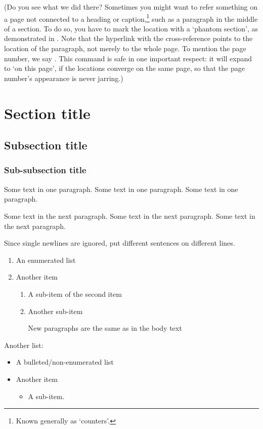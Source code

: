 \documentclass[embargoed]{grattan}
\begin{document}
(Do you see what we did there?
Sometimes you might want to refer something on a page not connected to a heading or caption,\footnote{Known generally as `counters'.} such as a paragraph in the middle of a section.
To do so, you have to mark the location with a `phantom section', as demonstrated in .
Note that the hyperlink with the cross-reference points to the location of the paragraph, not merely to the whole page.
To mention the page number, we say .
This command is safe in one important respect: it will expand to `on this page', if the locations converge on the same page, so that the page number's appearance is never jarring.)

\section{Section title}\label{sec:example}
\subsection{Subsection title}\label{subsec:example}
\subsubsection{Sub-subsection title}\label{subsubsec:example}
Some text in one paragraph. 
Some text in one paragraph. 
Some text in one paragraph. 

Some text in the next paragraph. 
Some text in the next paragraph. 
Some text in the next paragraph. 

Since single newlines are ignored, put different sentences on different lines.

\begin{enumerate}
	\item An enumerated list
	\item Another item
	\begin{enumerate}
		\item A sub-item of the second item
		\item Another sub-item

		New paragraphs are the same as in the body text
	\end{enumerate}
\end{enumerate}

Another list:
\begin{itemize}
	\item A bulleted/non-enumerated list
	\item Another item
	\begin{itemize}
		\item A sub-item.
	\end{itemize}
\end{itemize}
\end{document}
